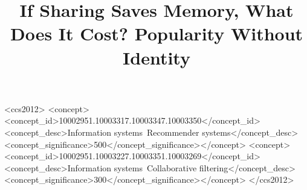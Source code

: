 \documentclass[sigconf,anonymous,review]{acmart}
\theoremstyle{acmdefinition}
\begin{document}
\title{If Sharing Saves Memory, What Does It Cost? Popularity Without Identity}

\begin{abstract}

\end{abstract}

\begin{CCSXML}
<ccs2012>
<concept><concept_id>10002951.10003317.10003347.10003350</concept_id>
<concept_desc>Information systems~Recommender systems</concept_desc><concept_significance>500</concept_significance></concept>
<concept><concept_id>10002951.10003227.10003351.10003269</concept_id>
<concept_desc>Information systems~Collaborative filtering</concept_desc><concept_significance>300</concept_significance></concept>
</ccs2012>
\end{CCSXML}

\maketitle













\appendix

\end{document}
